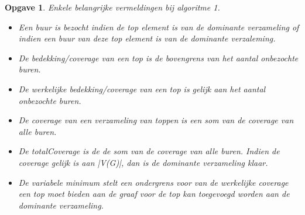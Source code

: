 \documentclass[11pt, a4paper]{article}
\newtheorem{opgave}{Opgave}
\begin{document}
\begin{opgave}
		Enkele belangrijke vermeldingen bij algoritme 1. 
		\begin{itemize}
		\item Een buur is bezocht indien de top element is van de dominante verzameling of indien een buur van deze top element is van de dominante verzaleming.
		\item De bedekking/coverage van een top is de bovengrens van het aantal onbezochte buren.
		\item De werkelijke bedekking/coverage van een top is gelijk aan het aantal onbezochte buren. 
		\item De coverage van een verzameling van toppen is een som van de coverage van alle buren.
		\item De totalCoverage is de de som van de coverage van alle buren. Indien de coverage gelijk is aan |V(G)|, dan is de dominante verzameling klaar. 
		\item De variabele minimum stelt een ondergrens voor van de werkelijke coverage een top moet bieden aan de graaf voor de top kan toegevoegd worden aan de dominante verzameling.
		\end{itemize}
		

\end{opgave}
\end{document}
